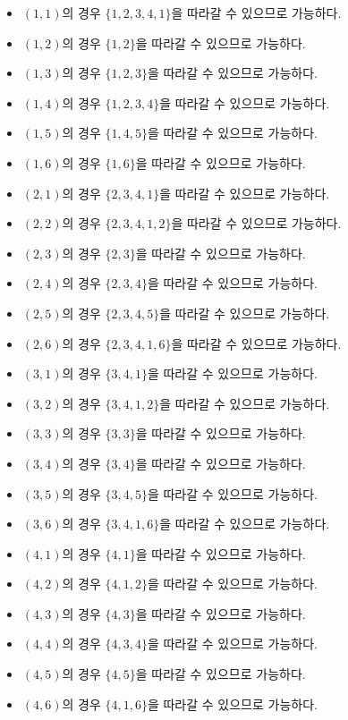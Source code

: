 \documentclass{oblivoir}
\begin{document}
\begin{itemize}
    \item $(1,1)$의 경우 $\{1,2,3,4,1\}$을 따라갈 수 있으므로 가능하다.
    \item $(1,2)$의 경우 $\{1,2\}$을 따라갈 수 있으므로 가능하다.
    \item $(1,3)$의 경우 $\{1,2,3\}$을 따라갈 수 있으므로 가능하다.
    \item $(1,4)$의 경우 $\{1,2,3,4\}$을 따라갈 수 있으므로 가능하다.
    \item $(1,5)$의 경우 $\{1,4,5\}$을 따라갈 수 있으므로 가능하다.
    \item $(1,6)$의 경우 $\{1,6\}$을 따라갈 수 있으므로 가능하다.
    \item $(2,1)$의 경우 $\{2,3,4,1\}$을 따라갈 수 있으므로 가능하다.
    \item $(2,2)$의 경우 $\{2,3,4,1,2\}$을 따라갈 수 있으므로 가능하다.
    \item $(2,3)$의 경우 $\{2,3\}$을 따라갈 수 있으므로 가능하다.
    \item $(2,4)$의 경우 $\{2,3,4\}$을 따라갈 수 있으므로 가능하다.
    \item $(2,5)$의 경우 $\{2,3,4,5\}$을 따라갈 수 있으므로 가능하다.
    \item $(2,6)$의 경우 $\{2,3,4,1,6\}$을 따라갈 수 있으므로 가능하다.
    \item $(3,1)$의 경우 $\{3,4,1\}$을 따라갈 수 있으므로 가능하다.
    \item $(3,2)$의 경우 $\{3,4,1,2\}$을 따라갈 수 있으므로 가능하다.
    \item $(3,3)$의 경우 $\{3,3\}$을 따라갈 수 있으므로 가능하다.
    \item $(3,4)$의 경우 $\{3,4\}$을 따라갈 수 있으므로 가능하다.
    \item $(3,5)$의 경우 $\{3,4,5\}$을 따라갈 수 있으므로 가능하다.
    \item $(3,6)$의 경우 $\{3,4,1,6\}$을 따라갈 수 있으므로 가능하다.
    \item $(4,1)$의 경우 $\{4,1\}$을 따라갈 수 있으므로 가능하다.
    \item $(4,2)$의 경우 $\{4,1,2\}$을 따라갈 수 있으므로 가능하다.
    \item $(4,3)$의 경우 $\{4,3\}$을 따라갈 수 있으므로 가능하다.
    \item $(4,4)$의 경우 $\{4,3,4\}$을 따라갈 수 있으므로 가능하다.
    \item $(4,5)$의 경우 $\{4,5\}$을 따라갈 수 있으므로 가능하다.
    \item $(4,6)$의 경우 $\{4,1,6\}$을 따라갈 수 있으므로 가능하다.

\end{itemize}
\end{document}
